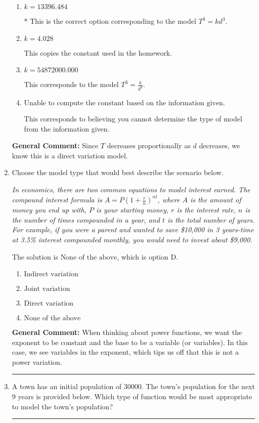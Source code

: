 \documentclass{extbook}[14pt]
\newcommand{\litem}[1]{\item #1

\rule{\textwidth}{0.4pt}}
\begin{document}
\begin{enumerate}
{\begin{enumerate}[label=\Alph*.]
This corresponds to the model $T^{1/3} = k d^{1/3}$.
\item \( k = 13396.484 \)

* This is the correct option corresponding to the model $T^{3} = k d^{3}$.
\item \( k = 4.028 \)

This copies the constant used in the homework.
\item \( k = 54872000.000 \)

This corresponds to the model $T^{3} = \frac{k}{d^{3}}$.
\item \( \text{Unable to compute the constant based on the information given.} \)

This corresponds to believing you cannot determine the type of model from the information given.
\end{enumerate}

\textbf{General Comment:} Since $T$ decreases proportionally as $d$ decreases, we know this is a direct variation model.
}
\litem{
Choose the model type that would best describe the scenario below.

\begin{center}
    \textit{ In economics, there are two common equations to model interest earned. The compound interest formula is $A = P (1 + \frac{r}{n})^{nt}$, where $A$ is the amount of money you end up with, $P$ is your starting money, $r$ is the interest rate, $n$ is the number of times compounded in a year, and $t$ is the total number of years. For example, if you were a parent and wanted to save \$10,000 in 3 years-time at 3.5\% interest compounded monthly, you would need to invest about \$9,000. }
\end{center}
The solution is \( \text{None of the above} \), which is option D.\begin{enumerate}[label=\Alph*.]
\item \( \text{Indirect variation} \)


\item \( \text{Joint variation} \)


\item \( \text{Direct variation} \)


\item \( \text{None of the above} \)


\end{enumerate}

\textbf{General Comment:} When thinking about power functions, we want the exponent to be constant and the base to be a variable (or variables). In this case, we see variables in the exponent, which tips us off that this is not a power variation.
}
\litem{
A town has an initial population of 30000. The town's population for the next 9 years is provided below. Which type of function would be most appropriate to model the town's population?


}
\end{enumerate}
\end{document}
